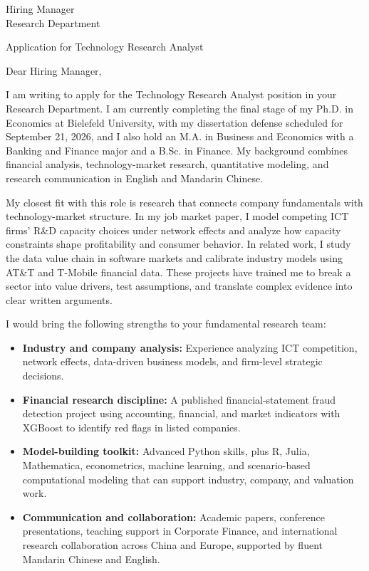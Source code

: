 \documentclass[11pt]{article}
\begin{document}
\noindent
Hiring Manager \\
Research Department \\

\vspace{0.1cm}

\noindent
Application for Technology Research Analyst \\

\vspace{0.05cm}

\noindent Dear Hiring Manager,

I am writing to apply for the Technology Research Analyst position in your Research Department. I am currently completing the final stage of my Ph.D. in Economics at Bielefeld University, with my dissertation defense scheduled for September 21, 2026, and I also hold an M.A. in Business and Economics with a Banking and Finance major and a B.Sc. in Finance. My background combines financial analysis, technology-market research, quantitative modeling, and research communication in English and Mandarin Chinese.

My closest fit with this role is research that connects company fundamentals with technology-market structure. In my job market paper, I model competing ICT firms' R\&D capacity choices under network effects and analyze how capacity constraints shape profitability and consumer behavior. In related work, I study the data value chain in software markets and calibrate industry models using AT\&T and T-Mobile financial data. These projects have trained me to break a sector into value drivers, test assumptions, and translate complex evidence into clear written arguments.

I would bring the following strengths to your fundamental research team:

\begin{itemize}
    \item \textbf{Industry and company analysis:} Experience analyzing ICT competition, network effects, data-driven business models, and firm-level strategic decisions.
    \item \textbf{Financial research discipline:} A published financial-statement fraud detection project using accounting, financial, and market indicators with XGBoost to identify red flags in listed companies.
    \item \textbf{Model-building toolkit:} Advanced Python skills, plus R, Julia, Mathematica, econometrics, machine learning, and scenario-based computational modeling that can support industry, company, and valuation work.
    \item \textbf{Communication and collaboration:} Academic papers, conference presentations, teaching support in Corporate Finance, and international research collaboration across China and Europe, supported by fluent Mandarin Chinese and English.
\end{itemize}
\end{document}
